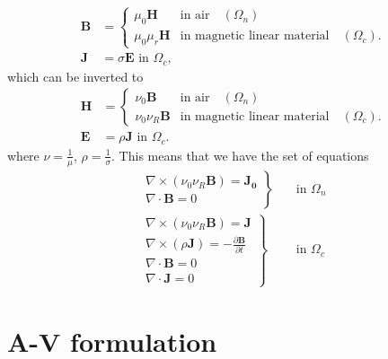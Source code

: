 \documentclass{article}
\newcommand{\curlp}[1]{\nabla \times \left(#1\right)}
\newcommand{\mbf}[1]{\mathbf{#1}}
\begin{document}
\begin{align*}
    \mbf{B}&=\begin{cases}
    \mu_0 \mbf{H} &\text{in air}\quad(\Omega_n)\\
    \mu_0 \mu_r \mbf{H} &\text{in magnetic linear material}\quad(\Omega_c).
    \end{cases}\\
    \mbf{J}&= \sigma \mbf{E} \text{ in } \Omega_c,
\end{align*}
which can be inverted to
\begin{subequations}
\begin{align}
    \mbf{H}&=\begin{cases}
        \nu_0 \mbf{B} &\text{in air}\quad(\Omega_n)\\
        \nu_0 \nu_R \mbf{B} & \text{in magnetic linear material}\quad(\Omega_c).
    \end{cases}\label{eq:HB}\\
    \mbf{E} &= \rho \mbf{J}\text{ in } \Omega_c.
\end{align}
\end{subequations}
where $\nu = \frac{1}{\mu}$, $\rho=\frac{1}{\sigma}$.
This means that we have the set of equations
\begin{subequations}
\begin{align}
    \left.\begin{array}{c}
        \curlp{\nu_0\nu_R \mbf{B}} = \mbf{J_0}\\
        \nabla \cdot \mbf{B} = 0
    \end{array}
    \right\}\quad&\text{in } \Omega_n \label{eq:Maxwell:n}\\
        \left.\begin{array}{c}
        \curlp{\nu_0\nu_R\mbf{B}} = \mbf{J} \\
        \curlp{\rho \mbf{J}} = -\frac{\partial \mbf{B}}{\partial t}\\
        \nabla \cdot \mbf{B}  = 0\\
        \nabla \cdot \mbf{J} = 0
    \end{array}
    \right\}\quad&\text{in } \Omega_c \label{eq:Maxwell:c}
\end{align}
\end{subequations}

\section{A-V formulation}
\end{document}
